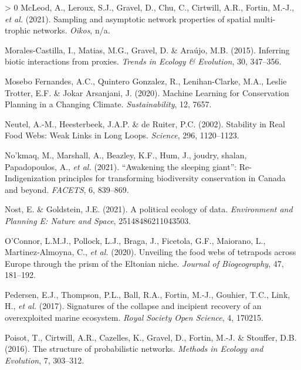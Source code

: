 \documentclass[10pt,oneside]{article}
\newlength{\cslhangindent}
\newenvironment{CSLReferences}[3] %
 {%
  \setlength{\parindent}{0pt}
  \ifodd #1 \everypar{\setlength{\hangindent}{\cslhangindent}}\ignorespaces\fi
  \ifnum #2 > 0
  \setlength{\parskip}{#2\baselineskip}
  \fi
 }%
 {}
\begin{document}
\begin{CSLReferences}{1}{0}
\leavevmode\hypertarget{ref-McLeod2021SamAsy}{}%
McLeod, A., Leroux, S.J., Gravel, D., Chu, C., Cirtwill, A.R., Fortin,
M.-J., \emph{et al.} (2021). Sampling and asymptotic network properties
of spatial multi-trophic networks. \emph{Oikos}, n/a.

\leavevmode\hypertarget{ref-Morales-Castilla2015InfBio}{}%
Morales-Castilla, I., Matias, M.G., Gravel, D. \& Araújo, M.B. (2015).
Inferring biotic interactions from proxies. \emph{Trends in Ecology \&
Evolution}, 30, 347--356.

\leavevmode\hypertarget{ref-MoseboFernandes2020MacLea}{}%
Mosebo Fernandes, A.C., Quintero Gonzalez, R., Lenihan-Clarke, M.A.,
Leslie Trotter, E.F. \& Jokar Arsanjani, J. (2020). Machine Learning for
Conservation Planning in a Changing Climate. \emph{Sustainability}, 12,
7657.

\leavevmode\hypertarget{ref-Neutel2002StaRea}{}%
Neutel, A.-M., Heesterbeek, J.A.P. \& de Ruiter, P.C. (2002). Stability
in Real Food Webs: Weak Links in Long Loops. \emph{Science}, 296,
1120--1123.

\leavevmode\hypertarget{ref-Nokmaq2021AwaSle}{}%
No'kmaq, M., Marshall, A., Beazley, K.F., Hum, J., joudry, shalan,
Papadopoulos, A., \emph{et al.} (2021). {``Awakening the sleeping
giant''}: Re-Indigenization principles for transforming biodiversity
conservation in Canada and beyond. \emph{FACETS}, 6, 839--869.

\leavevmode\hypertarget{ref-Nost2021PolEco}{}%
Nost, E. \& Goldstein, J.E. (2021). A political ecology of data.
\emph{Environment and Planning E: Nature and Space}, 25148486211043503.

\leavevmode\hypertarget{ref-OConnor2020UnvFoo}{}%
O'Connor, L.M.J., Pollock, L.J., Braga, J., Ficetola, G.F., Maiorano,
L., Martinez‐Almoyna, C., \emph{et al.} (2020). Unveiling the food webs
of tetrapods across Europe through the prism of the Eltonian niche.
\emph{Journal of Biogeography}, 47, 181--192.

\leavevmode\hypertarget{ref-Pedersen2017SigCol}{}%
Pedersen, E.J., Thompson, P.L., Ball, R.A., Fortin, M.-J., Gouhier,
T.C., Link, H., \emph{et al.} (2017). Signatures of the collapse and
incipient recovery of an overexploited marine ecosystem. \emph{Royal
Society Open Science}, 4, 170215.

\leavevmode\hypertarget{ref-Poisot2016StrPro}{}%
Poisot, T., Cirtwill, A.R., Cazelles, K., Gravel, D., Fortin, M.-J. \&
Stouffer, D.B. (2016). The structure of probabilistic networks.
\emph{Methods in Ecology and Evolution}, 7, 303--312.


\end{CSLReferences}
\end{document}
